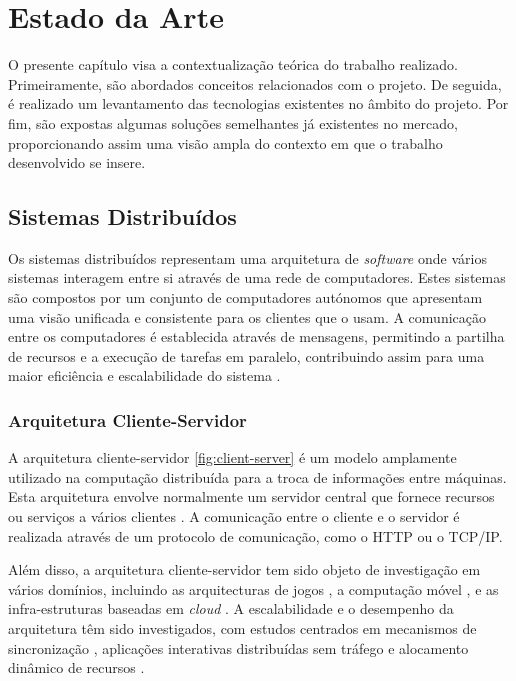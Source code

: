 \chapter{Estado da Arte}
\label{sec:2-EstadoArte}

O presente capítulo visa a contextualização teórica do trabalho realizado. Primeiramente, são 
abordados conceitos relacionados com o projeto. De seguida, é realizado um levantamento das 
tecnologias existentes no âmbito do projeto. Por fim, são expostas algumas soluções semelhantes 
já existentes no mercado, proporcionando assim uma visão ampla do contexto em que o trabalho 
desenvolvido se insere.

\section{Sistemas Distribuídos}

Os sistemas distribuídos representam uma arquitetura de \textit{software} onde vários sistemas 
interagem entre si através de uma rede de computadores. Estes sistemas são compostos por um conjunto 
de computadores autónomos que apresentam uma visão unificada e consistente para os clientes que o 
usam. A comunicação entre os computadores é establecida através de mensagens, permitindo a partilha 
de recursos e a execução de tarefas em paralelo, contribuindo assim para uma maior eficiência
e escalabilidade do sistema \cite{verissimo2001distributed}.

\subsection{Arquitetura Cliente-Servidor}

A arquitetura cliente-servidor \ref{fig:client-server} é um modelo amplamente utilizado na computação distribuída para a 
troca de informações entre máquinas. Esta arquitetura envolve normalmente um servidor central que
fornece recursos ou serviços a vários clientes \cite{clientserver2019}. A comunicação entre o cliente
e o servidor é realizada através de um protocolo de comunicação, como o HTTP ou o TCP/IP.

Além disso, a arquitetura cliente-servidor tem sido objeto de investigação em vários domínios, 
incluindo as arquitecturas de jogos \cite{clientserver2018}, a computação móvel \cite{clientserver1999},
e as infra-estruturas baseadas em \textit{cloud} \cite{clientserver2012}. A escalabilidade e o 
desempenho da arquitetura têm sido investigados, com estudos centrados em mecanismos de sincronização
\cite{clientserver2004}, aplicações interativas distribuídas sem tráfego \cite{clientserver2015} e
alocamento dinâmico de recursos \cite{clientserver2012}.

